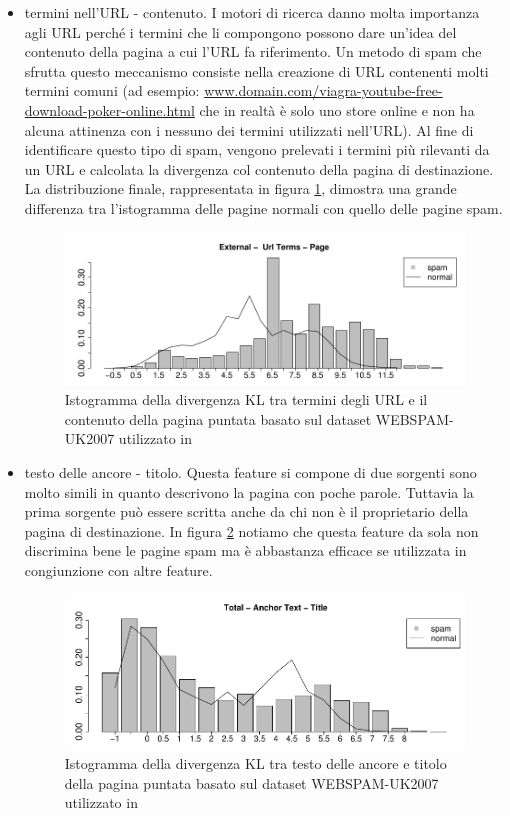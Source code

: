 \begin{itemize}
\item termini nell'URL - contenuto. I motori di ricerca danno molta importanza agli URL perché i termini che  li compongono  possono dare un'idea del contenuto della pagina a cui l'URL fa riferimento.  Un metodo di spam che sfrutta questo meccanismo consiste nella creazione di URL contenenti molti termini comuni (ad esempio: \url{www.domain.com/viagra-youtube-free-download-poker-online.html} che in realtà è solo uno store online e non ha alcuna attinenza con i nessuno dei termini utilizzati nell'URL). Al fine di identificare questo tipo di spam, vengono prelevati i termini più rilevanti da un URL e calcolata la divergenza col contenuto della pagina di destinazione. La distribuzione finale, rappresentata in figura \ref{fig:martinez3}, dimostra una grande differenza tra l'istogramma delle pagine normali con quello delle pagine spam.
\begin{figure}[htbp]
\centering
\includegraphics[width=12cm]{immagini/martinez/martinez3}
\caption{Istogramma della divergenza KL tra termini degli URL e il contenuto della pagina puntata basato sul dataset WEBSPAM-UK2007 utilizzato in \cite{Martinez-Romo:2009:WSI:1531914.1531920}}
\label{fig:martinez3}
\end{figure}

\item testo delle ancore - titolo. Questa feature si compone di due sorgenti sono molto simili in quanto descrivono la pagina con poche parole. Tuttavia la prima sorgente può essere scritta anche da chi non è il proprietario della pagina di destinazione.  In figura \ref{fig:martinez4} notiamo che questa feature da sola non discrimina bene le pagine spam ma è abbastanza efficace se utilizzata in congiunzione con altre feature.
\begin{figure}[htbp]
\centering
\includegraphics[width=12cm]{immagini/martinez/martinez4}
\caption{Istogramma della divergenza KL tra testo delle ancore e titolo della pagina puntata basato sul dataset WEBSPAM-UK2007 utilizzato in \cite{Martinez-Romo:2009:WSI:1531914.1531920}}
\label{fig:martinez4}
\end{figure}


\end{itemize}
